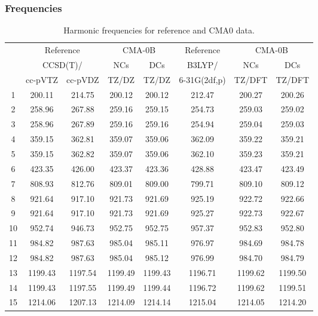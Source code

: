 \documentclass[10pt,oneside]{article}
\begin{document}
\subsubsection*{Frequencies}
\begin{table}[h!]
\centering
\caption{Harmonic frequencies for reference and CMA0 data.}
\begin{tabular}{cccccccc}
\toprule
{} & \multicolumn{2}{c}{Reference} & \multicolumn{2}{c}{CMA-0B} &    Reference & \multicolumn{2}{c}{CMA-0B} \\
{} & \multicolumn{2}{c}{CCSD(T)/} &     NCs &     DCs &       B3LYP/ &     NCs &     DCs \\
{} &   cc-pVTZ & cc-pVDZ &   TZ/DZ &   TZ/DZ & 6-31G(2df,p) &  TZ/DFT &  TZ/DFT \\
\midrule
1  &    200.11 &  214.75 &  200.12 &  200.12 &       212.47 &  200.27 &  200.26 \\
2  &    258.96 &  267.88 &  259.16 &  259.15 &       254.73 &  259.03 &  259.02 \\
3  &    258.96 &  267.89 &  259.16 &  259.16 &       254.94 &  259.04 &  259.03 \\
4  &    359.15 &  362.81 &  359.07 &  359.06 &       362.09 &  359.22 &  359.21 \\
5  &    359.15 &  362.82 &  359.07 &  359.06 &       362.10 &  359.23 &  359.21 \\
6  &    423.35 &  426.00 &  423.37 &  423.36 &       428.88 &  423.47 &  423.49 \\
7  &    808.93 &  812.76 &  809.01 &  809.00 &       799.71 &  809.10 &  809.12 \\
8  &    921.64 &  917.10 &  921.73 &  921.69 &       925.19 &  922.72 &  922.66 \\
9  &    921.64 &  917.10 &  921.73 &  921.69 &       925.27 &  922.73 &  922.67 \\
10 &    952.74 &  946.73 &  952.75 &  952.75 &       957.37 &  952.83 &  952.80 \\
11 &    984.82 &  987.63 &  985.04 &  985.11 &       976.97 &  984.69 &  984.78 \\
12 &    984.82 &  987.63 &  985.04 &  985.12 &       976.99 &  984.70 &  984.79 \\
13 &   1199.43 & 1197.54 & 1199.49 & 1199.43 &      1196.71 & 1199.62 & 1199.50 \\
14 &   1199.43 & 1197.55 & 1199.49 & 1199.44 &      1196.72 & 1199.62 & 1199.51 \\
15 &   1214.06 & 1207.13 & 1214.09 & 1214.14 &      1215.04 & 1214.05 & 1214.20 \\

\end{tabular}
\end{table}
\end{document}
